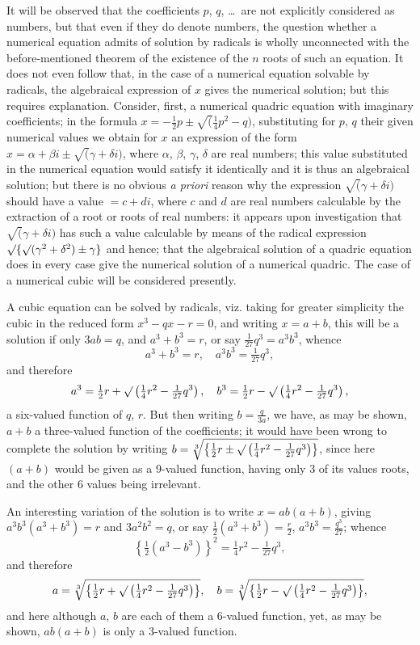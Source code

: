 \documentclass[12pt,a4paper]{article}
\theoremstyle{plain}
\theoremstyle{definition}
\theoremstyle{remark}
\begin{document}
It will be observed that the coefficients $p$, $q$, \ldots\ are not explicitly considered as numbers, but that even if they do denote numbers, the question whether a numerical equation admits of solution by radicals is wholly unconnected with the before-mentioned theorem of the existence of the $n$ roots of such an equation. It does not even follow that, in the case of a numerical equation solvable by radicals, the algebraical expression of $x$ gives the numerical solution; but this requires explanation. Consider, first, a numerical quadric equation with imaginary coefficients; in the formula $x = -\frac{1}{2}p \pm \surd(\frac{1}{4}p^2 - q)$, substituting for $p$, $q$ their given numerical values we obtain for $x$ an expression of the form $x = \alpha + \beta i \pm \surd(\gamma + \delta i)$, where $\alpha$, $\beta$, $\gamma$, $\delta$ are real numbers; this value substituted in the numerical equation would satisfy it identically and it is thus an algebraical solution; but there is no obvious \textit{a priori} reason why the expression $\surd(\gamma + \delta i)$ should have a value $= c + di$, where $c$ and $d$ are real numbers calculable by the extraction of a root or roots of real numbers: it appears upon investigation that $\surd(\gamma + \delta i)$ has such a value calculable by means of the radical expression $\surd\{\surd(\gamma^2 + \delta^2) \pm \gamma\}$ and hence; that the algebraical solution of a quadric equation does in every case give the numerical solution of a numerical quadric. The case of a numerical cubic will be considered presently.

A cubic equation can be solved by radicals, viz. taking for greater simplicity the cubic in the reduced form $x^3 - qx - r = 0$, and writing $x = a + b$, this will be a solution if only $3ab = q$, and $a^3 + b^3 = r$, or say $\frac{1}{27}q^3 = a^3b^3$, whence
\[
a^3 + b^3 = r, \quad a^3 b^3 = \tfrac{1}{27}q^3,
\]
and therefore
\[
a^3 = \tfrac{1}{2}r + \surd\left(\tfrac{1}{4}r^2 - \tfrac{1}{27}q^3\right), \quad b^3 = \tfrac{1}{2}r - \surd\left(\tfrac{1}{4}r^2 - \tfrac{1}{27}q^3\right),
\]
a six-valued function of $q$, $r$. But then writing $b = \frac{q}{3a}$, we have, as may be shown, $a + b$ a three-valued function of the coefficients; it would have been wrong to complete the solution by writing $b = \sqrt[3]{\left\{\frac{1}{2}r \pm \surd\left(\frac{1}{4}r^2 - \frac{1}{27}q^3\right)\right\}}$, since here $(a+b)$ would be given as a 9-valued function, having only 3 of its values roots, and the other 6 values being irrelevant.

An interesting variation of the solution is to write $x = ab(a+b)$, giving $a^3b^3(a^3+b^3) = r$ and $3a^2b^2 = q$, or say $\frac{1}{2}(a^3+b^3) = \frac{r}{2}$, $a^3b^3 = \frac{q^3}{27}$; whence
\[
\left\{\tfrac{1}{2}(a^3 - b^3)\right\}^2 = \tfrac{1}{4}r^2 - \tfrac{1}{27}q^3,
\]
and therefore
\[
a = \sqrt[3]{\left\{\tfrac{1}{2}r + \surd\left(\tfrac{1}{4}r^2 - \tfrac{1}{27}q^3\right)\right\}}, \quad b = \sqrt[3]{\left\{\tfrac{1}{2}r - \surd\left(\tfrac{1}{4}r^2 - \tfrac{1}{27}q^3\right)\right\}},
\]
and here although $a$, $b$ are each of them a 6-valued function, yet, as may be shown, $ab(a+b)$ is only a 3-valued function.
\end{document}
